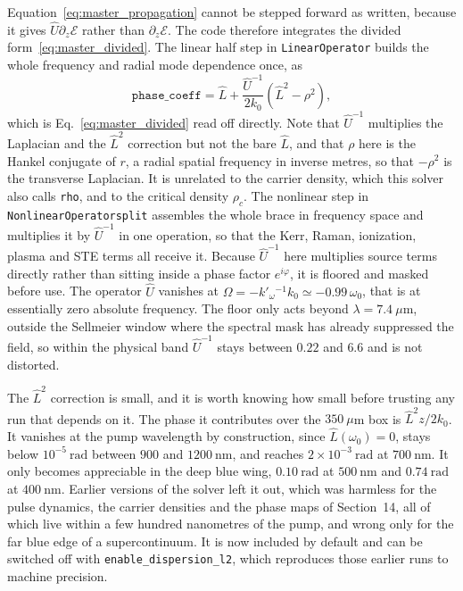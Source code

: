 Equation~\eqref{eq:master_propagation} cannot be stepped forward as written, because it gives $\hat{U}\partial_z \mathcal{E}$ rather than $\partial_z \mathcal{E}$. The code therefore integrates the divided form~\eqref{eq:master_divided}. The linear half step in \texttt{LinearOperator} builds the whole frequency and radial mode dependence once, as
\begin{equation}
\label{eq:phase_coeff}
\texttt{phase\_coeff} = \hat{L} + \frac{\hat{U}^{-1}}{2k_0}\left(\hat{L}^2-\rho^2\right),
\end{equation}
which is Eq.~\eqref{eq:master_divided} read off directly. Note that $\hat{U}^{-1}$ multiplies the Laplacian and the $\hat{L}^2$ correction but not the bare $\hat{L}$, and that $\rho$ here is the Hankel conjugate of $r$, a radial spatial frequency in inverse metres, so that $-\rho^2$ is the transverse Laplacian. It is unrelated to the carrier density, which this solver also calls \texttt{rho}, and to the critical density $\rho_c$. The nonlinear step in \texttt{NonlinearOperator\dotb split} assembles the whole brace in frequency space and multiplies it by $\hat{U}^{-1}$ in one operation, so that the Kerr, Raman, ionization, plasma and STE terms all receive it. Because $\hat{U}^{-1}$ here multiplies source terms directly rather than sitting inside a phase factor $e^{i\varphi}$, it is floored and masked before use. The operator $\hat{U}$ vanishes at $\Omega=-k'_\omega{}^{-1}k_0\simeq-0.99\,\omega_0$, that is at essentially zero absolute frequency. The floor only acts beyond $\lambda=7.4\ \mu\text{m}$, outside the Sellmeier window where the spectral mask has already suppressed the field, so within the physical band $\hat{U}^{-1}$ stays between $0.22$ and $6.6$ and is not distorted.

The $\hat{L}^2$ correction is small, and it is worth knowing how small before trusting any run that depends on it. The phase it contributes over the $350\ \mu$m box is $\hat{L}^2 z/2k_0$. It vanishes at the pump wavelength by construction, since $\hat{L}(\omega_0)=0$, stays below $10^{-5}\ \text{rad}$ between $900$ and $1200\ \text{nm}$, and reaches $2\times10^{-3}\ \text{rad}$ at $700\ \text{nm}$. It only becomes appreciable in the deep blue wing, $0.10\ \text{rad}$ at $500\ \text{nm}$ and $0.74\ \text{rad}$ at $400\ \text{nm}$. Earlier versions of the solver left it out, which was harmless for the pulse dynamics, the carrier densities and the phase maps of Section~14, all of which live within a few hundred nanometres of the pump, and wrong only for the far blue edge of a supercontinuum. It is now included by default and can be switched off with \texttt{enable\_dispersion\_l2}, which reproduces those earlier runs to machine precision.

